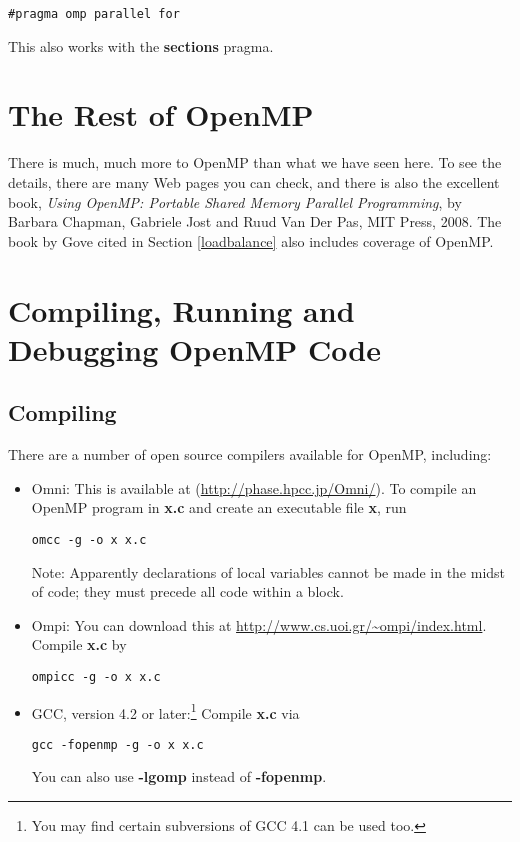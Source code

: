\begin{Verbatim}[fontsize=\relsize{-2}]
#pragma omp parallel for
\end{Verbatim}

This also works with the {\bf sections} pragma.

\section{The Rest of OpenMP}

There is much, much more to OpenMP than what we have seen here.  To see
the details, there are many Web pages you can check, and there is also
the excellent book, {\it Using OpenMP:  Portable Shared Memory Parallel
Programming}, by Barbara Chapman, Gabriele Jost and Ruud Van Der Pas,
MIT Press, 2008.  The book by Gove cited in Section \ref{loadbalance}
also includes coverage of OpenMP.

\section{Compiling, Running and Debugging OpenMP Code}

\subsection{Compiling}

There are a number of open source compilers available for OpenMP,
including:

\begin{itemize}

\item Omni:  This is available at (\url{http://phase.hpcc.jp/Omni/}).
To compile an OpenMP program in {\bf x.c} and create an executable file
{\bf x}, run

\begin{Verbatim}[fontsize=\relsize{-2}]
omcc -g -o x x.c
\end{Verbatim}

Note:  Apparently declarations of local variables cannot be made in the
midst of code; they must precede all code within a block.

\item Ompi:  You can download this at
\url{http://www.cs.uoi.gr/~ompi/index.html}.  Compile {\bf x.c} by

\begin{Verbatim}[fontsize=\relsize{-2}]
ompicc -g -o x x.c
\end{Verbatim}

\item GCC, version 4.2 or later:\footnote{You may find certain
subversions of GCC 4.1 can be used too.}  Compile {\bf x.c} via

\begin{Verbatim}[fontsize=\relsize{-2}]
gcc -fopenmp -g -o x x.c
\end{Verbatim}

You can also use {\bf -lgomp} instead of {\bf -fopenmp}.

\end{itemize}

